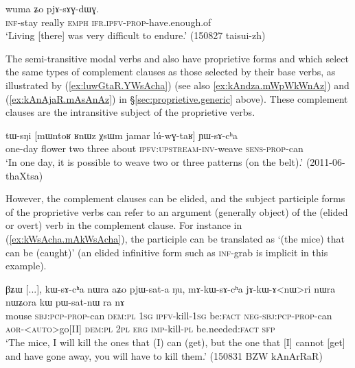 \begin{exe}
\ex \label{ex:kArAZi.pjAsAGdWG}
\gll [kɤ-rɤʑi] wuma ʑo pjɤ-sɤɣ-dɯɣ. \\
\textsc{inf}-stay really \textsc{emph} \textsc{ifr}.\textsc{ipfv}-\textsc{prop}-have.enough.of \\
\glt `Living [there] was very difficult to endure.' (150827 taisui-zh) 
\end{exe}

The semi-transitive modal verbs  and  also have proprietive forms      and  which select  the same types of complement clauses as those selected by their base verbs, as illustrated by (\ref{ex:luwGtaR.YWsAcha}) (see also \ref{ex:kAndza.mWpWkWnAz}) and (\ref{ex:kAnAjaR.mAsAnAz}) in §\ref{sec:proprietive.generic} above). These complement clauses are the intransitive subject of the proprietive verbs.
  
\begin{exe}
\ex \label{ex:luwGtaR.YWsAcha}
\gll  tɯ-sŋi [mɯntoʁ ʁnɯz χsɯm jamar lú-wɣ-taʁ] ɲɯ-sɤ-cʰa \\
one-day flower two three about \textsc{ipfv}:\textsc{upstream}-\textsc{inv}-weave  \textsc{sens}-\textsc{prop}-can \\
\glt `In one day, it is possible to weave two or three patterns (on the belt).' (2011-06-thaXtsa)
\end{exe}

However, the complement clauses can be elided, and the subject participle forms of the proprietive verbs can refer to an argument (generally object) of the  (elided or overt) verb in the complement clause. For instance in (\ref{ex:kWsAcha.mAkWsAcha}), the participle  can be translated as `(the mice) that can be (caught)' (an elided infinitive form such as  \textsc{inf}-grab is implicit in this example).

\begin{exe}
\ex \label{ex:kWsAcha.mAkWsAcha}
\gll βʑɯ [...], kɯ-sɤ-cʰa nɯra aʑo pjɯ-sat-a ŋu, mɤ-kɯ-sɤ-cʰa jɤ-kɯ-ɤ<nɯ>ri nɯra nɯʑora kɯ pɯ-sat-nɯ ra nɤ \\
mouse {   } \textsc{sbj}:\textsc{pcp}-\textsc{prop}-can \textsc{dem}:\textsc{pl} \textsc{1sg} \textsc{ipfv}-kill-\textsc{1sg} be:\textsc{fact} \textsc{neg}-\textsc{sbj}:\textsc{pcp}-\textsc{prop}-can \textsc{aor}-<\textsc{auto}>go[II] \textsc{dem}:\textsc{pl} \textsc{2pl} \textsc{erg} \textsc{imp}-kill-\textsc{pl} be.needed:\textsc{fact} \textsc{sfp} \\
\glt `The mice, I will kill the ones that (I) can (get), but the one that [I] cannot [get] and have gone away, you will have to kill them.' (150831 BZW kAnArRaR)
\end{exe}

